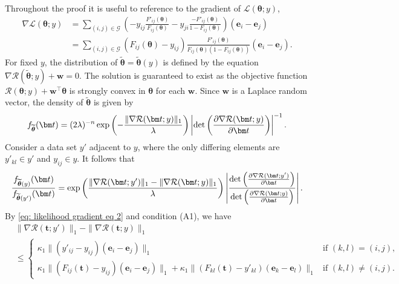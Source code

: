 \documentclass[letterpaper,12pt]{article}
\numberwithin{equation}{section}
\theoremstyle{plain}
\numberwithin{Theorem}{section}
\numberwithin{corollary}{section}
\numberwithin{proposition}{section}
\numberwithin{Lemma}{section}
{
	\theoremstyle{definition}
	\newtheorem{Definition}{Definition}
	\newtheorem{example}{Example}
	\numberwithin{example}{section}
	\newtheorem{fact}{Fact}
	\numberwithin{fact}{section}
	\newtheorem{remark}{Remark}
}
\newcommand{\1}{\mathbbm{1}}
\def\bth{{\boldsymbol{\theta}}}
\def\det{{\rm det}}
\begin{document}
	Throughout the proof it is useful to reference to the gradient of $\mathcal L(\bth; y)$,
	\begin{align}
		\nabla\mathcal L(\bth; y) &= \sum_{(i, j) \in \mathcal G} \left(-y_{ij}\frac{F'_{ij}(\bth)}{F_{ij}(\bth)} -y_{ji}\frac{-F'_{ij}(\bth)}{1 - F_{ij}(\bth)}\right) (\bm e_i - \bm e_j) \label{eq: likelihood gradient eq 1}\\
		&= \sum_{(i, j) \in \mathcal G} (F_{ij}(\bth) - y_{ij})\frac{F'_{ij}(\bth)}{F_{ij}(\bth)(1 - F_{ij}(\bth))}(\bm e_i - \bm e_j). \label{eq: likelihood gradient eq 2}
	\end{align} 
	For fixed $y$, the distribution of $\widetilde\bth = \widetilde\bth(y)$ is defined by the equation $\nabla \mathcal R(\widetilde\bth; y) + \bm w = 0$. The solution is guaranteed to exist as the objective function $\mathcal R(\bth; y) + \bm w^\top \bth$ is strongly convex in $\bth$ for each $\bm w$.  Since $\bm w$ is a Laplace random vector, the density of $\widetilde\bth$ is given by
	\begin{align*}
		f_{\widetilde\bth}(\bm t) = (2\lambda)^{-n}\exp\left(-\frac{\|\nabla \mathcal R(\bm t; y)\|_1}{\lambda}\right) \left|\det \left(\frac{\partial \nabla \mathcal R(\bm t; y)}{\partial\bm t}\right)\right|^{-1}. 
	\end{align*}
	Consider a data set $y'$ adjacent to $y$, where the only differing elements are $y'_{kl} \in y'$ and $y_{ij} \in y$. It follows that
	\begin{align*}
		\frac{f_{\widetilde\bth(y)}(\bm t)}{f_{\widetilde\bth(y')}(\bm t)} = \exp\left(\frac{\|\nabla \mathcal R(\bm t; y')\|_1 - \|\nabla \mathcal R(\bm t; y)\|_1 }{\lambda}\right) \left|\frac{\det \left(\frac{\partial \nabla \mathcal R(\bm t; y')}{\partial\bm t}\right)}{\det \left(\frac{\partial \nabla \mathcal R(\bm t; y)}{\partial\bm t}\right)}\right|.
	\end{align*}
	By \eqref{eq: likelihood gradient eq 2} and condition (A1), we have
	\begin{align*}
		&\|\nabla \mathcal R(\bm t; y')\|_1 - \|\nabla \mathcal R(\bm t; y)\|_1 \\
		&\leq \begin{cases}
			\kappa_1 \|(y'_{ij} - y_{ij})(\bm e_i - \bm e_j)\|_1  & \text{if } (k, l) = (i, j), \\
			\kappa_1\|(F_{ij}(\bm t) - y_{ij})(\bm e_i - \bm e_j)\|_1 + \kappa_1\|(F_{kl}(\bm t) - y'_{kl})(\bm e_k - \bm e_l)\|_1& \text{if } (k, l) \neq (i, j).
		\end{cases}
	\end{align*}
\end{document}

